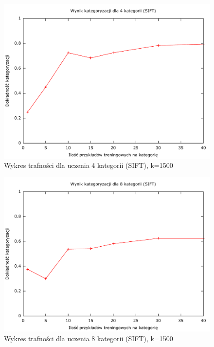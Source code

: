 \begin{figure}[h]
	\centering
	\includegraphics[scale=0.8]{graphics/04_interpretacja_wynikow/result-sift-4.pdf}
	\caption{ Wykres trafności dla uczenia 4 kategorii (SIFT), k=1500 }
	\label{fig:result-sift-4}
\end{figure}

\begin{figure}[h]
	\centering
	\includegraphics[scale=0.8]{graphics/04_interpretacja_wynikow/result-sift-8.pdf}
	\caption{ Wykres trafności dla uczenia 8 kategorii (SIFT), k=1500 }
	\label{fig:result-sift-8}
\end{figure}

